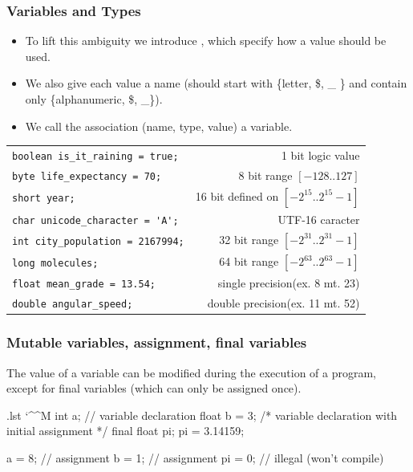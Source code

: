 \documentclass[10pt]{beamer}
\makeatletter
\newenvironment{code}{%
  \begingroup
  \@bsphack
  \immediate\openout\lstvrb@out\jobname.lst
  \let\do\@makeother\dospecials\catcode`\^^M\active
  \def\verbatim@processline{%
    \immediate\write\lstvrb@out{\the\verbatim@line}}%
  \verbatim@start}{%
  \immediate\closeout\lstvrb@out
  \@esphack
  \endgroup

  \begin{alertblock}{}
    
  \end{alertblock}}
\makeatother
\begin{document}
\begin{frame}[fragile]
  \frametitle{Variables and Types}
  \begin{itemize}
  \item
  To lift this ambiguity we introduce ,
  which specify how a value should be used.
  \item
  We also give each value a name (should start with \{letter, \$, \_ \} and contain only \{alphanumeric, \$, \_\}).
  \item
  We call the association (name, type, value) a variable.
  \end{itemize}

  \begin{example}
   \begin{longtable}{l|r}
   \lstinline!boolean is_it_raining = true;! & 1 bit logic value\\
   \pause
   \lstinline!byte life_expectancy = 70;! & 8 bit range $[-128..127]$ \\
   \lstinline!short year;! & 16 bit defined on $[-2^{15}..2^{15}-1]$ \\
   \lstinline!char unicode_character = 'A';! & UTF-16 caracter \\
   \pause
   \lstinline!int city_population = 2167994;! & 32 bit range $[-2^{31}..2^{31}-1]$ \\
   \pause
   \lstinline!long molecules;! &  64 bit range $[-2^{63}..2^{63}-1]$ \\
   \hline
   \pause
   \lstinline!float mean_grade = 13.54;! & single precision(ex. 8 mt. 23) \\
   \lstinline!double angular_speed;! & double precision(ex. 11 mt. 52) \\
  \end{longtable}
\end{example}
\end{frame}


\begin{frame}[fragile]
  \frametitle{Mutable variables, assignment, final variables}

  The value of a variable can be modified during the execution of a program,
  except for final variables (which can only be assigned once).

  \begin{code}
int a; // variable declaration
float b = 3; /* variable declaration with
                initial assignment */
final float pi;
pi = 3.14159;

a = 8;  // assignment
b = 1;  // assignment
pi = 0; // illegal (won't compile)
  \end{code}
\end{frame}
\end{document}
